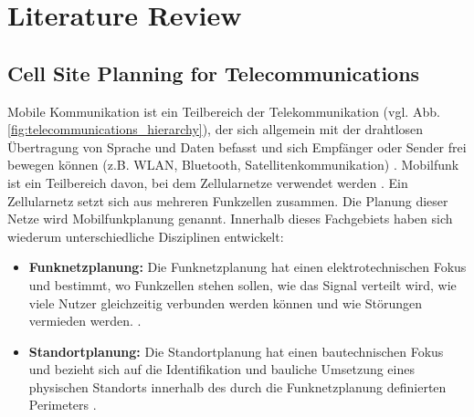 \chapter{Literature Review}
\label{sec:literature_review}

\section{Cell Site Planning for Telecommunications}
\begin{German}
    Mobile Kommunikation ist ein Teilbereich der Telekommunikation (vgl. Abb. \ref{fig:telecommunications_hierarchy}), der sich allgemein mit der drahtlosen Übertragung von Sprache und Daten befasst und sich Empfänger oder Sender frei bewegen können (z.B. WLAN, Bluetooth, Satellitenkommunikation) \cite{bundesamtfurstrahlenschutzWhatMobileCommunication}. Mobilfunk ist ein Teilbereich davon, bei dem Zellularnetze verwendet werden \cite{jiangCellularCommunicationNetworks2024}. Ein Zellularnetz setzt sich aus mehreren Funkzellen zusammen. Die Planung dieser Netze wird Mobilfunkplanung genannt. Innerhalb dieses Fachgebiets haben sich wiederum unterschiedliche Disziplinen entwickelt:

    \begin{itemize}
        \item \textbf{Funknetzplanung:} Die Funknetzplanung hat einen elektrotechnischen Fokus und bestimmt, wo Funkzellen stehen sollen, wie das Signal verteilt wird, wie viele Nutzer gleichzeitig verbunden werden können und wie Störungen vermieden werden. \cite{academyforlorawanrAcademyLoRaWANWhat,telecomtrainerRNPRadioNetwork2023}.

        \item \textbf{Standortplanung:} Die Standortplanung hat einen bautechnischen Fokus und bezieht sich auf die Identifikation und bauliche Umsetzung eines physischen Standorts innerhalb des durch die Funknetzplanung definierten Perimeters \cite{habibPDFStudyCell2024}.
    \end{itemize}
\end{German}
    
